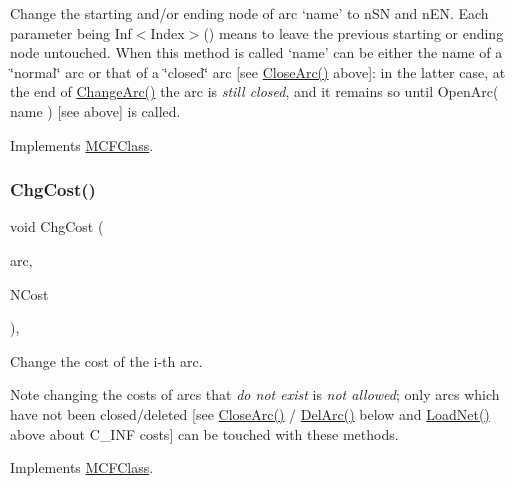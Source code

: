 Change the starting and/or ending node of arc `name' to n\+SN and n\+EN. Each parameter being Inf$<$\+Index$>$() means to leave the previous starting or ending node untouched. When this method is called `name' can be either the name of a \char`\"{}normal\char`\"{} arc or that of a \char`\"{}closed\char`\"{} arc \mbox{[}see \mbox{\hyperlink{class_s_p_tree_a4a964ce79159307998f5acd0018d01b1}{Close\+Arc()}} above\mbox{]}\+: in the latter case, at the end of \mbox{\hyperlink{class_s_p_tree_a23980253602d1183531a93a82d6e7f96}{Change\+Arc()}} the arc is {\itshape still closed}, and it remains so until Open\+Arc( name ) \mbox{[}see above\mbox{]} is called. 

Implements \mbox{\hyperlink{class_m_c_f_class_aef2d28b0b0a2420d6b8b7093d827fa67}{M\+C\+F\+Class}}.

\mbox{\label{class_s_p_tree_a5b694b932ddb1fc61d9f3d66aaca10e1}} 
\subsubsection{\texorpdfstring{Chg\+Cost()}{ChgCost()}}
{\footnotesize\ttfamily void Chg\+Cost (\begin{DoxyParamCaption}\item[{\mbox{\hyperlink{class_m_c_f_class_ad53d6229d7ec28555a9c9c2fd9abf773}{Index}}}]{arc,  }\item[{\mbox{\hyperlink{class_m_c_f_class_a07dbefeeb08c3f63073622411893eb76}{c\+C\+Number}}}]{N\+Cost }\end{DoxyParamCaption})\hspace{0.3cm}{\ttfamily [override]}, {\ttfamily [virtual]}}

Change the cost of the i-\/th arc.

\begin{DoxyNote}{Note}
changing the costs of arcs that {\itshape do not exist} is {\itshape not allowed}; only arcs which have not been closed/deleted \mbox{[}see \mbox{\hyperlink{class_s_p_tree_a4a964ce79159307998f5acd0018d01b1}{Close\+Arc()}} / \mbox{\hyperlink{class_s_p_tree_a3b6145c95b83f40a76d724eb2b92f80f}{Del\+Arc()}} below and \mbox{\hyperlink{class_s_p_tree_afbfa5c036f9ea67e35005ec77b82214a}{Load\+Net()}} above about C\+\_\+\+I\+NF costs\mbox{]} can be touched with these methods. 
\end{DoxyNote}


Implements \mbox{\hyperlink{class_m_c_f_class_a41ab6d76a454b3f792665cce35a250f3}{M\+C\+F\+Class}}.

